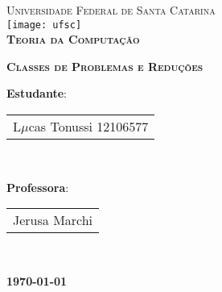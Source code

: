\begin{titlepage}
\begin{center}

\textsc{\large Universidade Federal de Santa Catarina}\\[1cm]

\texttt{[image: ufsc]}\\[1.5cm]

\textsc{\LARGE \bfseries Teoria da Computação \\ [0.8cm]}

\textsc{\LARGE \bfseries Classes de Problemas e Reduções \\ [3cm]}


\begin{Large}
\textbf{Estudante}:
\begin{tabular}{|l}
L$\mu$cas Tonussi 12106577\\
\end{tabular} \\[0.5cm]
\end{Large}

\vfill

\begin{Large}
\textbf{Professora}:
\begin{tabular}{|l}
Jerusa Marchi \\
\end{tabular} \\[0.5cm]
\end{Large}

\vfill


\textbf{\today}

\end{center}
\end{titlepage}